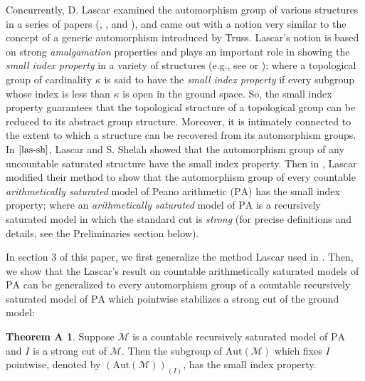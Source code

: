 \documentclass[11pt]{article}
\theoremstyle{plain}
\theoremstyle{definition}
\newcommand{\M}{\mathcal{M}}
\newcommand{\A}{\mathrm{Aut}}
\newcommand{\pa}{\mathrm{PA}}
\begin{document}
Concurrently, D. Lascar examined the automorphism group of various  structures in a series of papers (\cite{las1}, \cite{las2}, and \cite{las3}), and came out with a notion very similar to the concept of a generic automorphism introduced by Truss. Lascar’s notion is based on strong \textit{amalgamation} properties and plays an important role in showing the \textit{small index property} in a variety of structures (e.g., see \cite{hod} or \cite{las-sh}); where a topological group of cardinality $\kappa$ is said to have the \textit{small index property} if every subgroup whose index is less than $\kappa$ is open in the ground space.  So, the small index property guarantees that the topological  structure of a topological group can be reduced to its abstract group structure. Moreover, it is intimately connected to the extent to which a structure can be recovered from its automorphism groups. In $\cite{las-sh}$, Lascar and S. Shelah  showed that the automorphism group of any uncountable saturated structure have the small index property. Then in \cite{las}, Lascar modified their method to show that the automorphism group of every countable \textit{arithmetically saturated} model of Peano arithmetic ($\pa$)  has the small index property; where an \textit{arithmetically saturated} model of $\pa$ is a recursively saturated model in which the standard cut is \textit{strong} (for precise definitions and details, see the Preliminaries section below).

In section 3 of this paper, we first generalize the method Lascar used in \cite{las}. Then, we show that the Lascar's result on countable arithmetically saturated models of $\pa$ can be generalized to every automorphism group of a countable recursively saturated model of $\pa$ which pointwise stabilizes a strong cut of the ground model:
\newtheorem*{aaaa}{Theorem A}
\begin{aaaa}
Suppose $\M$ is a countable recursively saturated model of $\pa$ and $I$ is a strong cut of $\M$. Then the subgroup of $\A(\M)$ which fixes  $I$ pointwise, denoted by $(\A(\M))_{(I)}$,  has the small index property.
\end{aaaa}
\end{document}

